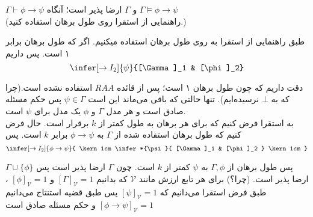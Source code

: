 
	$\Gamma \vdash \phi \to \psi$
	و $\Gamma$ ارضا پذیر است؛ آنگاه
	$\Gamma \vDash \phi \to \psi$\\
	(راهنمایی از استقرا روی طول برهان استفاده کنید.)
	
	\quad\vspace{0.5 cm}
	\begin {ans}
	طبق راهنمایی از استقرا به روی طول برهان استفاده میکنیم. 
	اگر که طول برهان برابر ۱ است. پس داریم 
	$$
	\infer[\to I_2]{\psi}{[\Gamma]_1 & [\phi]_2}
	$$
	
	دقت داریم که چون طول برهان ۱ است؛
	پس از قائده
	$RAA$
	استفاده نشده است.(چرا که به $\bot$ نرسیده‌ایم). تنها حالتی که باقی‌ می‌ماند این است
	$\psi \in \Gamma$
	پس حکم مسئله صادق است و هر مدل
	$\Gamma$ و $\phi$
	یک مدل برای
	$\psi$
	است.\\
	
	به استقرا فرض کنیم که برای هر برهان به طول کمتر از 
	$k$
	برقرار است. حال فرض کنیم که طول برهان استفاده شده از 
	$\Gamma$
	به 
	$\phi \to \psi$
	برابر 
	$k$
	است. 
	پس $$
	\infer[\to I_2]{\phi \to \psi}{
		\kern 1cm	
		\infer*{\psi}{
			[\Gamma]_1
			&
			[\phi]_2
		}
		\kern 1cm
	}
	$$
	
	پس طول برهان از 
	$\Gamma , \phi$
	به
	$\psi$ 
	کمتر از $k$ است.
	چون $\Gamma$ ارضا پذیر است پس 
	$\Gamma \cup \{\phi\}$ 
	ارضا پذیر است. (چرا؟)
	برای هر تابع ارزش مانند
	$\mathcal {V}$ 
	که بدانیم
	$[\Gamma]_\mathcal{V} = 1$ و $[\phi]_\mathcal{V} = 1$ 
	، طبق فرض استقرا می‌دانیم که
	$[\psi]_\mathcal{V} = 1$
	پس طبق قضیه استنتاج می‌دانیم
	$[\phi \to \psi]_\mathcal{V} = 1$
	و حکم مسئله صادق است \\
	
	
	\end {ans}
